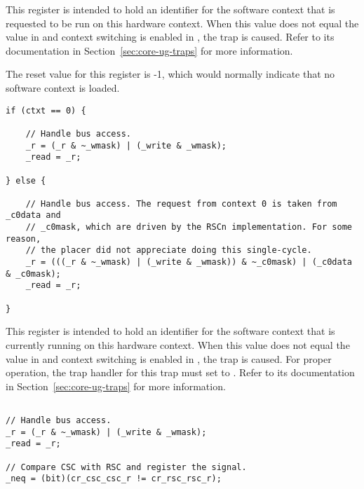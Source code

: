 
This register is intended to hold an identifier for the software context that is 
requested to be run on this hardware context. When this value does not equal the 
value in  and context switching is enabled in , the 
 trap is caused. Refer to its documentation in 
Section~\ref{sec:core-ug-traps} for more information.

The reset value for this register is -1, which would normally indicate that no
software context is loaded.

\reset{--------------------------------}
\declaration{}
\implementation{}
\begin{lstlisting}
if (ctxt == 0) {
    
    // Handle bus access.
    _r = (_r & ~_wmask) | (_write & _wmask);
    _read = _r;
    
} else {
    
    // Handle bus access. The request from context 0 is taken from _c0data and
    // _c0mask, which are driven by the RSCn implementation. For some reason,
    // the placer did not appreciate doing this single-cycle.
    _r = (((_r & ~_wmask) | (_write & _wmask)) & ~_c0mask) | (_c0data & _c0mask);
    _read = _r;
    
}
\end{lstlisting}


This register is intended to hold an identifier for the software context that is 
currently running on this hardware context. When this value does not equal the 
value in  and context switching is enabled in , the 
 trap is caused. For proper operation, the trap handler
for this trap must set  to . Refer to its documentation in 
Section~\ref{sec:core-ug-traps} for more information.

\declaration{}
\implementation{}
\begin{lstlisting}

// Handle bus access.
_r = (_r & ~_wmask) | (_write & _wmask);
_read = _r;

// Compare CSC with RSC and register the signal.
_neq = (bit)(cr_csc_csc_r != cr_rsc_rsc_r);

\end{lstlisting} %

